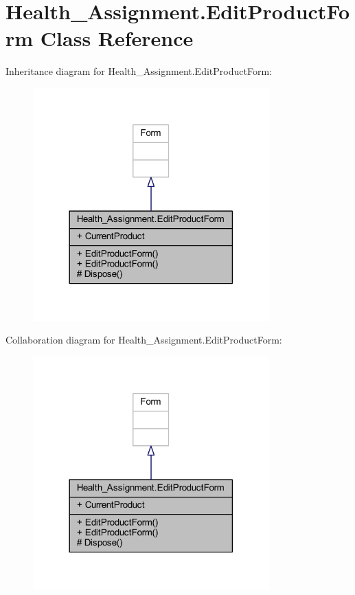 \hypertarget{class_health___assignment_1_1_edit_product_form}{}\section{Health\+\_\+\+Assignment.\+Edit\+Product\+Form Class Reference}
\label{class_health___assignment_1_1_edit_product_form}


Inheritance diagram for Health\+\_\+\+Assignment.\+Edit\+Product\+Form\+:\nopagebreak
\begin{figure}[H]
\begin{center}
\leavevmode
\includegraphics[width=258pt]{class_health___assignment_1_1_edit_product_form__inherit__graph}
\end{center}
\end{figure}


Collaboration diagram for Health\+\_\+\+Assignment.\+Edit\+Product\+Form\+:\nopagebreak
\begin{figure}[H]
\begin{center}
\leavevmode
\includegraphics[width=258pt]{class_health___assignment_1_1_edit_product_form__coll__graph}
\end{center}
\end{figure}
